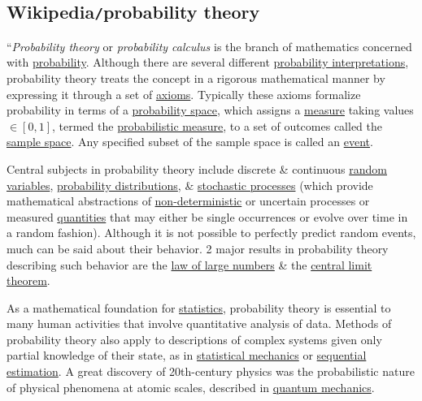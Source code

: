 \documentclass{article}
\begin{document}

\subsection{Wikipedia{\tt/}probability theory}
``{\it Probability theory} or {\it probability calculus} is the branch of mathematics concerned with \href{https://en.wikipedia.org/wiki/Probability}{probability}. Although there are several different \href{https://en.wikipedia.org/wiki/Probability_interpretations}{probability interpretations}, probability theory treats the concept in a rigorous mathematical manner by expressing it through a set of \href{https://en.wikipedia.org/wiki/Axioms_of_probability}{axioms}. Typically these axioms formalize probability in terms of a \href{https://en.wikipedia.org/wiki/Probability_space}{probability space}, which assigns a \href{https://en.wikipedia.org/wiki/Measure_(mathematics)}{measure} taking values $\in[0,1]$, termed the \href{https://en.wikipedia.org/wiki/Probability_measure}{probabilistic measure}, to a set of outcomes called the \href{https://en.wikipedia.org/wiki/Sample_space}{sample space}. Any specified subset of the sample space is called an \href{https://en.wikipedia.org/wiki/Event_(probability_theory)}{event}.

Central subjects in probability theory include discrete \& continuous \href{https://en.wikipedia.org/wiki/Random_variable}{random variables}, \href{https://en.wikipedia.org/wiki/Probability_distributions}{probability distributions}, \& \href{https://en.wikipedia.org/wiki/Stochastic_process}{stochastic processes} (which provide mathematical abstractions of \href{https://en.wikipedia.org/wiki/Determinism}{non-deterministic} or uncertain processes or measured \href{https://en.wikipedia.org/wiki/Quantity}{quantities} that may either be single occurrences or evolve over time in a random fashion). Although it is not possible to perfectly predict random events, much can be said about their behavior. 2 major results in probability theory describing such behavior are the \href{https://en.wikipedia.org/wiki/Law_of_large_numbers}{law of large numbers} \& the \href{https://en.wikipedia.org/wiki/Central_limit_theorem}{central limit theorem}.

As a mathematical foundation for \href{https://en.wikipedia.org/wiki/Statistics}{statistics}, probability theory is essential to many human activities that involve quantitative analysis of data. Methods of probability theory also apply to descriptions of complex systems given only partial knowledge of their state, as in \href{https://en.wikipedia.org/wiki/Statistical_mechanics}{statistical mechanics} or \href{https://en.wikipedia.org/wiki/Sequential_estimation}{sequential estimation}. A great discovery of 20th-century physics was the probabilistic nature of physical phenomena at atomic scales, described in \href{https://en.wikipedia.org/wiki/Quantum_mechanics}{quantum mechanics}.
\end{document}
